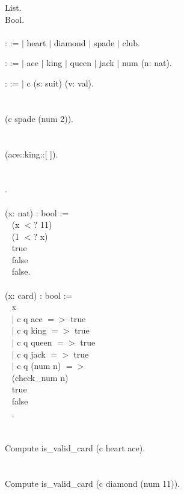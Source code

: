 \begin{code}
\Load List. 	\\
\Load Bool.
\\ \\
\Inductive {} : \Type :=
  $\mid$ heart
  $\mid$ diamond
  $\mid$ spade
  $\mid$ club.

\Inductive {} : \Type :=
  $\mid$ ace
  $\mid$ king
  $\mid$ queen
  $\mid$ jack
  $\mid$ num (n: nat).

\Inductive {} : \Type :=
  $\mid$ c (s: suit) (v: val).
\\ \\
 	\\
\Check (c spade (num 2)).
\\ \\
	\\
\Check (ace::king::[ ]).
\\ \\
 	\\
.
\\ \\
\Definition {} (x: nat) : bool :=	 \\ \-\ \quad
  \If (x $<?$ 11)						 \\ \-\ \quad
  \Then \If (1 $<?$ x)					 \\ \-\ \qquad
       \Then true						 \\ \-\ \qquad
       \Else false						 \\ \-\ \quad
  \Else false.
\\ \\
\Definition {} (x: card) : bool :=	 \\ \-\ \quad
 \match x \with						 \\ \-\ \quad
  $\mid$ c q ace $=>$ true				 \\ \-\ \quad
  $\mid$ c q king $=>$ true			 \\ \-\ \quad
  $\mid$ c q queen $=>$ true			 \\ \-\ \quad
  $\mid$ c q jack $=>$ true			 \\ \-\ \quad
  $\mid$ c q (num n) $=>$ 				 \\ \-\ \qquad\quad
        \If (check\_num n)				 \\ \-\ \qquad\quad
        \Then true			 			 \\ \-\ \qquad\quad
        \Else false						 \\ \-\ \quad
 \End.
\\ \\
	\\
Compute is\_valid\_card (c heart ace).
\\ \\
	\\
Compute is\_valid\_card (c diamond (num 11)).


\end{code}

